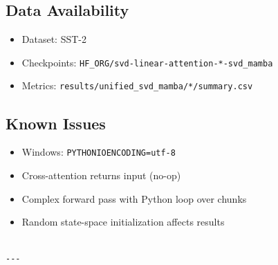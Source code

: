 \subsection{Data Availability}

\begin{itemize}
\item Dataset: SST-2
\item Checkpoints: \texttt{{{HF\_ORG}}/svd-linear-attention-*-svd\_mamba}
\item Metrics: \texttt{results/unified\_svd\_mamba/*/summary.csv}

\end{itemize}
\subsection{Known Issues}

\begin{itemize}
\item Windows: \texttt{PYTHONIOENCODING=utf-8}
\item Cross-attention returns input (no-op)
\item Complex forward pass with Python loop over chunks
\item Random state-space initialization affects results
\end{itemize}
\begin{lstlisting}

---
\end{lstlisting}